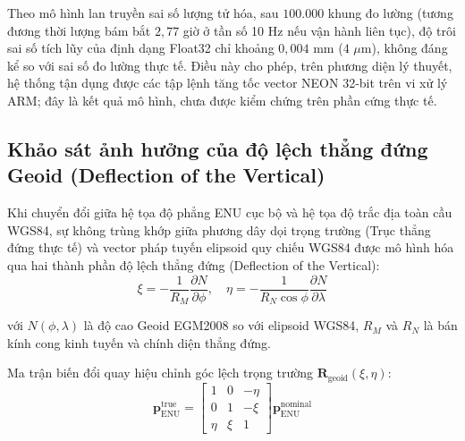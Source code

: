Theo mô hình lan truyền sai số lượng tử hóa, sau $100.000$ khung đo lường (tương đương thời lượng bám bắt $2{,}77$ giờ ở tần số 10 Hz nếu vận hành liên tục), độ trôi sai số tích lũy của định dạng Float32 chỉ khoảng $0{,}004$ mm ($4$ $\mu$m), không đáng kể so với sai số đo lường thực tế. Điều này cho phép, trên phương diện lý thuyết, hệ thống tận dụng được các tập lệnh tăng tốc vector NEON 32-bit trên vi xử lý ARM; đây là kết quả mô hình, chưa được kiểm chứng trên phần cứng thực tế.

\subsection{Khảo sát ảnh hưởng của độ lệch thẳng đứng Geoid (Deflection of the Vertical)}

\hspace{0.5cm} Khi chuyển đổi giữa hệ tọa độ phẳng ENU cục bộ và hệ tọa độ trắc địa toàn cầu WGS84, sự không trùng khớp giữa phương dây dọi trọng trường (Trục thẳng đứng thực tế) và vector pháp tuyến elipsoid quy chiếu WGS84 được mô hình hóa qua hai thành phần độ lệch thẳng đứng (Deflection of the Vertical):
\begin{equation}
\xi = -\frac{1}{R_M} \frac{\partial N}{\partial \phi}, \quad \eta = -\frac{1}{R_N \cos\phi} \frac{\partial N}{\partial \lambda}
\label{eq:deflection-of-vertical-components-w15}
\end{equation}

với $N(\phi, \lambda)$ là độ cao Geoid EGM2008 so với elipsoid WGS84, $R_M$ và $R_N$ là bán kính cong kinh tuyến và chính diện thẳng đứng.

Ma trận biến đổi quay hiệu chỉnh góc lệch trọng trường $\mathbf{R}_{\text{geoid}}(\xi, \eta)$:
\begin{equation}
\mathbf{p}_{\text{ENU}}^{\text{true}} = \begin{bmatrix}
1 & 0 & -\eta \\
0 & 1 & -\xi \\
\eta & \xi & 1
\end{bmatrix} \mathbf{p}_{\text{ENU}}^{\text{nominal}}
\label{eq:geoid-deflection-dcm-matrix-w15}
\end{equation}

